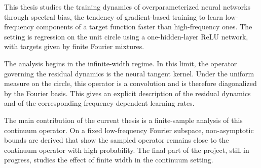 This thesis studies the training dynamics of overparameterized neural networks through
spectral bias, the tendency of gradient-based training to learn low-frequency components of
a target function faster than high-frequency ones. The setting is regression on the unit
circle using a one-hidden-layer ReLU network, with targets given by finite Fourier
mixtures.

The analysis begins in the infinite-width regime. In this limit, the operator governing the
residual dynamics is the neural tangent kernel. Under the uniform measure on the circle,
this operator is a convolution and is therefore diagonalized by the Fourier basis. This
gives an explicit description of the residual dynamics and of the corresponding
frequency-dependent learning rates.

The main contribution of the current thesis is a finite-sample analysis of this continuum
operator. On a fixed low-frequency Fourier subspace, non-asymptotic bounds are derived that
show the sampled operator remains close to the continuum operator with high probability. The
final part of the project, still in progress, studies the effect of finite width in the
continuum setting.
